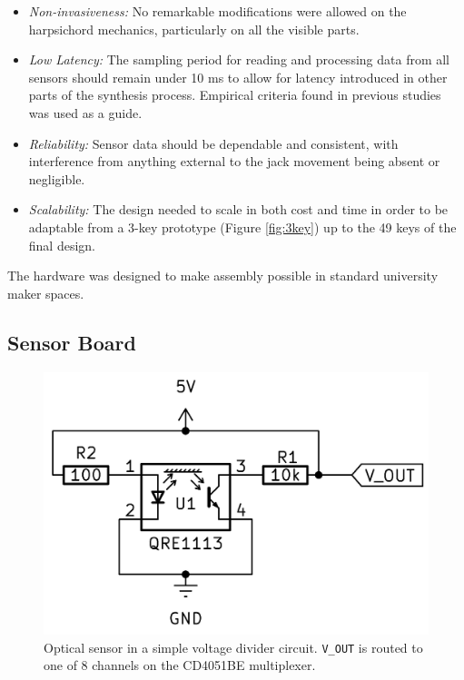 \begin{itemize}
    \item \emph{Non-invasiveness:} No remarkable modifications were allowed on the harpsichord mechanics, particularly on all the visible parts.
    \item \emph{Low Latency:} The sampling period for reading and processing data from all sensors should remain under 10 ms to allow for latency introduced in other parts of the synthesis process. Empirical criteria found in previous studies \cite{Jack2016} was used as a guide.
    \item \emph{Reliability:} Sensor data should be dependable and consistent, with interference from anything external to the jack movement being absent or negligible.
    \item \emph{Scalability:} The design needed to scale in both cost and time in order to be adaptable from a 3-key prototype (Figure \ref{fig:3key}) up to the 49 keys of the final design.
\end{itemize}

The hardware was designed to make assembly possible in standard university maker spaces.  

\subsection{Sensor Board}\label{sensor-board}

\begin{figure}[!b] 
  \centering
  \includegraphics[width=0.7\linewidth,trim={0 0.5cm 0 0.5cm},clip]{src/images/simple-schematic-bw-.jpg} 
  \caption{Optical sensor in a simple voltage divider circuit. \texttt{V\_OUT} is routed to one of 8 channels on the CD4051BE multiplexer.}
  \label{fig:simple-schematic}
\end{figure}

